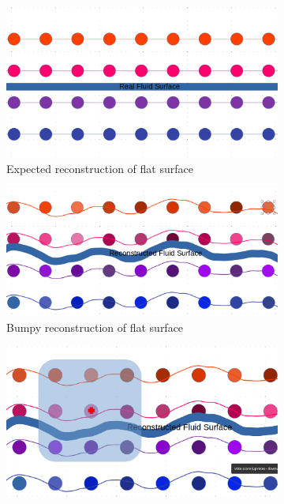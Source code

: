 \begin{figure}[H]
        \begin{subfigure}[b]{0.5\textwidth}
               \includegraphics[width=\textwidth]{figures/RealFluidSurfaceLevelSet.png}
               \caption{Expected reconstruction of flat surface}
               \label{fig:expected_fs}
        \end{subfigure}
        \begin{subfigure}[b]{0.5\textwidth}
               \includegraphics[width=\textwidth]{figures/ReconstructedFluidSurface.png}
               \caption{Bumpy reconstruction of flat surface}
				\label{fig:recon_fs}
        \end{subfigure}
        \begin{subfigure}[b]{0.5\textwidth}
               \includegraphics[width=\textwidth]{figures/LevelSetBlurFullKernel.png}

\end{subfigure}
\end{figure}
